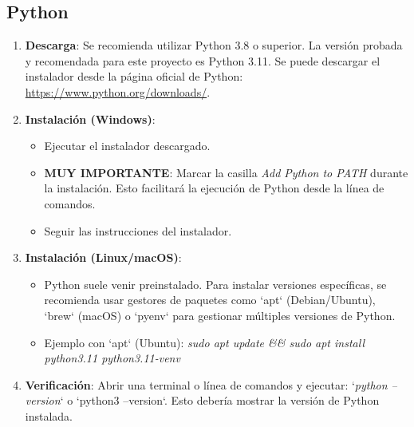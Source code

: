 \subsection{Python}
\begin{enumerate}
\item \textbf{Descarga}: Se recomienda utilizar Python 3.8 o superior. La versión probada y recomendada para este proyecto es Python 3.11. Se puede descargar el instalador desde la página oficial de Python: \url{https://www.python.org/downloads/}.
\item \textbf{Instalación (Windows)}:
\begin{itemize}
\item Ejecutar el instalador descargado.
\item \textbf{MUY IMPORTANTE}: Marcar la casilla  \textit{Add Python to PATH}  durante la instalación. Esto facilitará la ejecución de Python desde la línea de comandos.
\item Seguir las instrucciones del instalador.
\end{itemize}
\item \textbf{Instalación (Linux/macOS)}:
\begin{itemize}
\item Python suele venir preinstalado. Para instalar versiones específicas, se recomienda usar gestores de paquetes como `apt` (Debian/Ubuntu), `brew` (macOS) o `pyenv` para gestionar múltiples versiones de Python.
\item Ejemplo con `apt` (Ubuntu): \textit{sudo apt update \&\& sudo apt install python3.11 python3.11-venv}
\end{itemize}
\item \textbf{Verificación}: Abrir una terminal o línea de comandos y ejecutar: `\textit{python --version}` o `python3 --version`. Esto debería mostrar la versión de Python instalada.
\end{enumerate}

